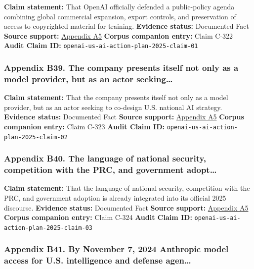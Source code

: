 \documentclass[
  american,
  11pt,
  letterpaper,
]{article}
\begin{document}
\textbf{Claim statement:} That OpenAI officially defended a
public-policy agenda combining global commercial expansion, export
controls, and preservation of access to copyrighted material for
training. \textbf{Evidence status:} Documented Fact \textbf{Source
support:}
\hyperref[ch-07-appendix-a5-openais-proposals-for-the-us-ai-action-plan]{Appendix
A5} \textbf{Corpus companion entry:} Claim C-322 \textbf{Audit Claim
ID:} \texttt{openai-us-ai-action-plan-2025-claim-01}

\subsubsection{Appendix B39. The company presents itself not only as a
model provider, but as an actor
seeking\ldots{}}\label{ch-07-appendix-b39-the-company-presents-itself-not-only-as-a-model-provider-but-as-an-actor-seeking}

\textbf{Claim statement:} That the company presents itself not only as a
model provider, but as an actor seeking to co-design U.S. national AI
strategy. \textbf{Evidence status:} Documented Fact \textbf{Source
support:}
\hyperref[ch-07-appendix-a5-openais-proposals-for-the-us-ai-action-plan]{Appendix
A5} \textbf{Corpus companion entry:} Claim C-323 \textbf{Audit Claim
ID:} \texttt{openai-us-ai-action-plan-2025-claim-02}

\subsubsection{Appendix B40. The language of national security,
competition with the PRC, and government
adopt\ldots{}}\label{ch-07-appendix-b40-the-language-of-national-security-competition-with-the-prc-and-government-adopt}

\textbf{Claim statement:} That the language of national security,
competition with the PRC, and government adoption is already integrated
into its official 2025 discourse. \textbf{Evidence status:} Documented
Fact \textbf{Source support:}
\hyperref[ch-07-appendix-a5-openais-proposals-for-the-us-ai-action-plan]{Appendix
A5} \textbf{Corpus companion entry:} Claim C-324 \textbf{Audit Claim
ID:} \texttt{openai-us-ai-action-plan-2025-claim-03}

\subsubsection{Appendix B41. By November 7, 2024 Anthropic model access
for U.S. intelligence and defense
agen\ldots{}}\label{ch-07-appendix-b41-by-november-7-2024-anthropic-model-access-for-u-s-intelligence-and-defense-agen}
\end{document}
